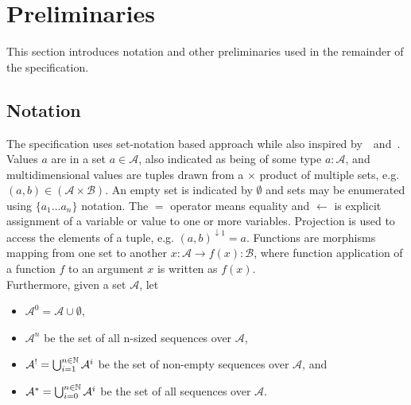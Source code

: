\clearpage
\section{Preliminaries}\label{sec:prel}

This section introduces notation and other preliminaries used in the remainder
of the specification.

\subsection{Notation}

The specification uses set-notation based approach while also inspired
by~\cite{eutxo-2}~and~\cite{eutxo}. Values $a$ are in a set $a \in \mathcal{A}$,
also indicated as being of some type $a : \mathcal{A}$, and multidimensional values are
tuples drawn from a $\times$ product of multiple sets, e.g.
$(a,b) \in (\mathcal{A} \times \mathcal{B})$. An empty set is indicated by
$\emptyset$ and sets may be enumerated using $\{a_1 \dots a_n\}$ notation. The $=$ operator means
equality and $\gets$ is explicit assignment of a variable or value to one
or more variables. Projection is used to access the elements of a tuple, e.g.
${(a,b)}^{\downarrow1} = a$. Functions are morphisms mapping from one set to another
 $x : \mathcal{A} \to f(x) : \mathcal{B}$, where function
application of a function $f$ to an argument $x$ is written as $f(x)$. \\

\noindent Furthermore, given a set $\mathcal{A}$, let
\begin{itemize}
  \item $\mathcal{A}^0 = \mathcal{A} \cup \emptyset$,
  \item $\mathcal{A}^n$ be the set of all n-sized sequences over $\mathcal{A}$,
  \item $\mathcal{A}^! = \bigcup_{i=1}^{n \in \mathbb{N}} \mathcal{A}^{i}$ be the set of non-empty sequences over $\mathcal{A}$, and
  \item $\mathcal{A}^* = \bigcup_{i=0}^{n \in \mathbb{N}} \mathcal{A}^{i}$ be
  the set of all sequences over $\mathcal{A}$.
\end{itemize}


